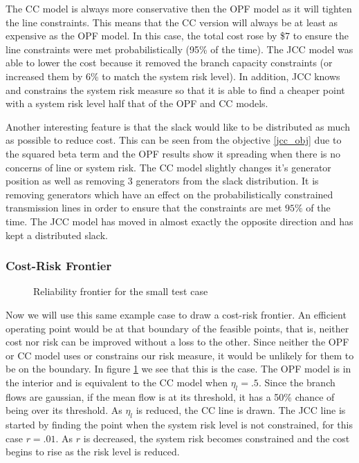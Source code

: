 The CC model is always more conservative then the OPF model as it will tighten the line constraints.  This means that the CC version will always be at least as expensive as the OPF model.  In this case, the total cost rose by \$7 to ensure the line constraints were met probabilistically (95\% of the time).  The JCC model was able to lower the cost because it removed the branch capacity constraints (or increased them by 6\% to match the system risk level).  In addition, JCC knows and constrains the system risk measure so that it is able to find a cheaper point with a system risk level half that of the OPF and CC models.



Another interesting feature is that the slack would like to be distributed as much as possible to reduce cost.  This can be seen from the objective \ref{jcc_obj} due to the squared beta term and the OPF results show it spreading when there is no concerns of line or system risk.  The CC model slightly changes it's generator position as well as removing 3 generators from the slack distribution.  It is removing generators which have an effect on the probabilistically constrained transmission lines in order to ensure that the constraints are met $95\%$ of the time.  The JCC model has moved in almost exactly the opposite direction and has kept a distributed slack.


\subsubsection*{Cost-Risk Frontier}
  \begin{figure} 
\centering

\caption{Reliability frontier for the small test case}\label{costriskfront}
\end{figure}

Now we will use this same example case to draw a cost-risk frontier.  An efficient operating point would be at that boundary of the feasible points, that is, neither cost nor risk can be improved without a loss to the other.  Since neither the OPF or CC model uses or constrains our risk measure, it would be unlikely for them to be on the boundary.  In figure \ref{costriskfront} we see that this is the case.  The OPF model is in the interior and is equivalent to the CC model when $\eta_l=.5$.  Since the branch flows are gaussian, if the mean flow is at its threshold, it has a 50\% chance of being over its threshold.  As $\eta_l$ is reduced, the CC line is drawn.  The JCC line is started by finding the point when the system risk level is not constrained, for this case $r=.01$.  As $r$ is decreased, the system risk becomes constrained and the cost begins to rise as the risk level is reduced.


